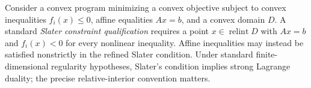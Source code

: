 
Consider a convex program minimizing a convex objective subject to convex inequalities $f_i(x)\le0$, affine equalities $Ax=b$, and a convex domain $D$. A standard \emph{Slater constraint qualification} requires a point $x\in\operatorname{relint}D$ with $Ax=b$ and $f_i(x)<0$ for every nonlinear inequality. Affine inequalities may instead be satisfied nonstrictly in the refined Slater condition. Under standard finite-dimensional regularity hypotheses, Slater's condition implies strong Lagrange duality; the precise relative-interior convention matters.
